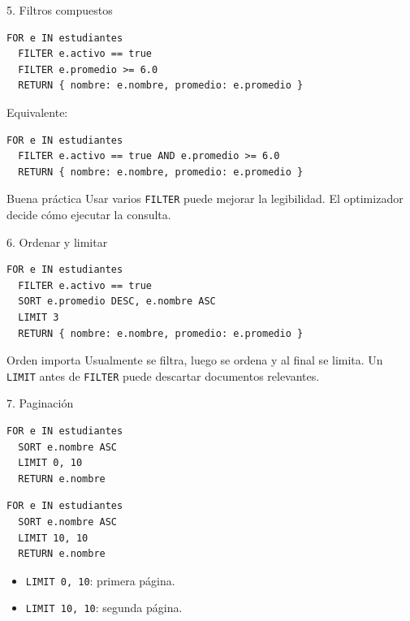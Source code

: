 \documentclass[aspectratio=169,11pt]{beamer}
\begin{document}
\begin{frame}[fragile]{5. Filtros compuestos}
\begin{lstlisting}
FOR e IN estudiantes
  FILTER e.activo == true
  FILTER e.promedio >= 6.0
  RETURN { nombre: e.nombre, promedio: e.promedio }
\end{lstlisting}

Equivalente:
\begin{lstlisting}
FOR e IN estudiantes
  FILTER e.activo == true AND e.promedio >= 6.0
  RETURN { nombre: e.nombre, promedio: e.promedio }
\end{lstlisting}

\begin{block}{Buena práctica}
Usar varios \texttt{FILTER} puede mejorar la legibilidad. El optimizador decide cómo ejecutar la consulta.
\end{block}
\end{frame}

\begin{frame}[fragile]{6. Ordenar y limitar}
\begin{lstlisting}
FOR e IN estudiantes
  FILTER e.activo == true
  SORT e.promedio DESC, e.nombre ASC
  LIMIT 3
  RETURN { nombre: e.nombre, promedio: e.promedio }
\end{lstlisting}

\vspace{0.25cm}
\begin{alertblock}{Orden importa}
Usualmente se filtra, luego se ordena y al final se limita. Un \texttt{LIMIT} antes de \texttt{FILTER} puede descartar documentos relevantes.
\end{alertblock}
\end{frame}

\begin{frame}[fragile]{7. Paginación}
\begin{lstlisting}
FOR e IN estudiantes
  SORT e.nombre ASC
  LIMIT 0, 10
  RETURN e.nombre
\end{lstlisting}

\begin{lstlisting}
FOR e IN estudiantes
  SORT e.nombre ASC
  LIMIT 10, 10
  RETURN e.nombre
\end{lstlisting}

\vspace{0.2cm}
\begin{itemize}
  \item \texttt{LIMIT 0, 10}: primera página.
  \item \texttt{LIMIT 10, 10}: segunda página.
\end{itemize}
\end{frame}
\end{document}
